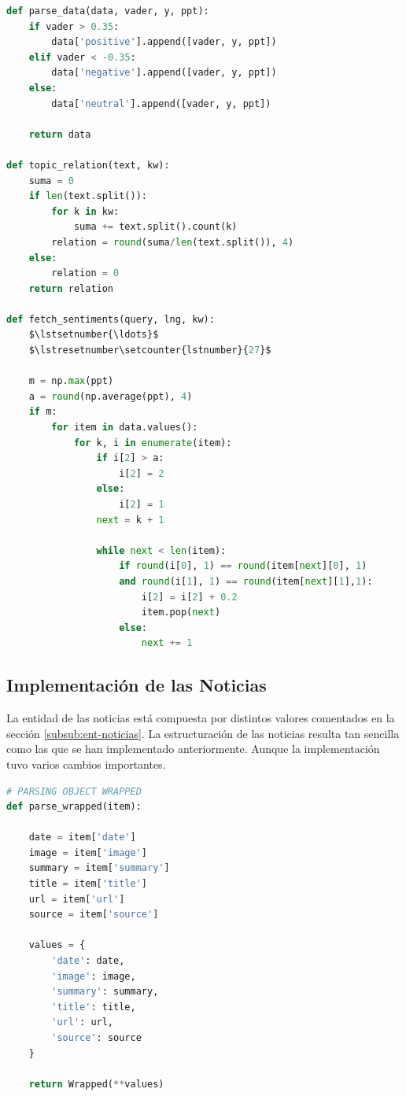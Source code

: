 \begin{lstlisting}[caption=Extracción de las coordenadas de los sentimientos,          label={lst:extraccion-senti},language=Python, mathescape=true]
def parse_data(data, vader, y, ppt):
    if vader > 0.35:
        data['positive'].append([vader, y, ppt])
    elif vader < -0.35:
        data['negative'].append([vader, y, ppt])
    else:
        data['neutral'].append([vader, y, ppt])

    return data

def topic_relation(text, kw):
    suma = 0
    if len(text.split()):
        for k in kw:
            suma += text.split().count(k)
        relation = round(suma/len(text.split()), 4)
    else:
        relation = 0
    return relation

def fetch_sentiments(query, lng, kw):
    $\lstsetnumber{\ldots}$
    $\lstresetnumber\setcounter{lstnumber}{27}$
    
    m = np.max(ppt)
    a = round(np.average(ppt), 4)
    if m:
        for item in data.values():
            for k, i in enumerate(item):
                if i[2] > a:
                    i[2] = 2
                else:
                    i[2] = 1
                next = k + 1
    
                while next < len(item):
                    if round(i[0], 1) == round(item[next][0], 1)
                    and round(i[1], 1) == round(item[next][1],1):
                        i[2] = i[2] + 0.2
                        item.pop(next)
                    else:
                        next += 1
\end{lstlisting}

\subsection{Implementación de las Noticias}
La entidad de las noticias está compuesta por distintos valores comentados en la sección \ref{subsub:ent-noticias}. La estructuración de las noticias resulta tan sencilla como las que se han implementado anteriormente. Aunque la implementación tuvo varios cambios importantes.

\vspace{0.3cm}

\begin{lstlisting}[caption=Estructuración de las noticias,language=Python, mathescape=true]
# PARSING OBJECT WRAPPED
def parse_wrapped(item):

    date = item['date']
    image = item['image']
    summary = item['summary']
    title = item['title']
    url = item['url']
    source = item['source']

    values = {
        'date': date,
        'image': image,
        'summary': summary,
        'title': title,
        'url': url,
        'source': source
    }

    return Wrapped(**values)
\end{lstlisting}

